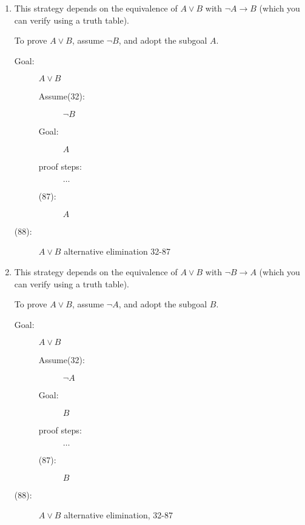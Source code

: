 \documentclass[12pt]{article}
\begin{document}
\begin{enumerate}

\item This strategy depends on the equivalence of $A \vee B$ with
$\neg A \rightarrow B$ (which you can verify using a truth table).

To prove $A \vee B$, assume $\neg B$, and adopt the subgoal $A$.

\begin{description}

\item[Goal:]  $A \vee B$

\begin{description}

\item[Assume(32):]  $\neg B$

\item[Goal:] $A$

\item[proof steps:]  $\ldots$

\item[(87):]  $A$

\end{description}

\item[(88):]  $A \vee B$ alternative elimination 32-87


\end{description}

\newpage

\item This strategy depends on the equivalence of $A \vee B$ with
$\neg B \rightarrow A$ (which you can verify using a truth table).

To prove $A \vee B$, assume $\neg A$, and adopt the subgoal $B$.

\begin{description}

\item[Goal:]  $A \vee B$

\begin{description}

\item[Assume(32):]  $\neg A$

\item[Goal:] $B$

\item[proof steps:]  $\ldots$

\item[(87):]  $B$

\end{description}

\item[(88):]  $A \vee B$ alternative elimination, 32-87


\end{description}

\end{enumerate}
\end{document}
